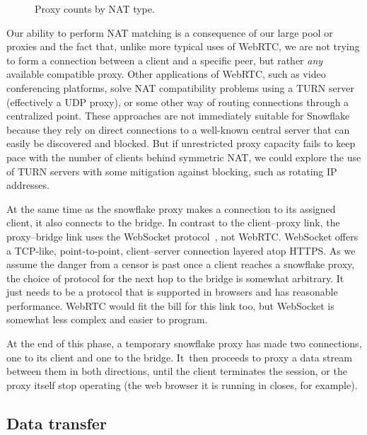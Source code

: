 \documentclass[letterpaper,twocolumn]{article}
\begin{document}
\begin{figure}
\caption{Proxy counts by NAT type.}
\label{fig:proxies-by-nats}
\end{figure}

Our ability to perform NAT matching is a consequence of our large pool or proxies
and the fact that, unlike more typical uses of WebRTC,
we are not trying to form a connection between a client and a specific peer,
but rather \emph{any} available compatible proxy.
Other applications of WebRTC, such as video conferencing platforms,
solve NAT compatibility problems using a TURN server (effectively a UDP proxy),
or some other way of routing connections through a centralized point.
These approaches are not immediately suitable for Snowflake because
they rely on direct connections to a well-known central server
that can easily be discovered and blocked.
But if unrestricted proxy capacity fails to keep pace
with the number of clients behind symmetric NAT,
we could explore the use of TURN servers with some mitigation
against blocking, such as rotating IP addresses.

At the same time as the snowflake proxy makes a connection to its assigned client,
it also connects to the bridge.
In contrast to the client--proxy link,
the proxy--bridge link
uses the WebSocket protocol~\cite{rfc6455}, not WebRTC.
WebSocket offers a TCP-like, point-to-point, client--server connection
layered atop HTTPS.
As we assume the danger from a censor is past
once a client reaches a snowflake proxy,
the choice of protocol for the next hop to the bridge is somewhat arbitrary.
It just needs to be a protocol that is supported in browsers
and has reasonable performance.
WebRTC would fit the bill for this link too,
but WebSocket is somewhat less complex and easier to program.

At the end of this phase,
a temporary snowflake proxy has made two connections,
one to its client and one to the bridge.
It~then proceeds to proxy a data stream between them
in both directions,
until the client terminates the session,
or the proxy itself stop operating
(the web browser it is running in closes, for example).

\subsection{Data transfer}
\label{sec:data-transfer}
\end{document}

